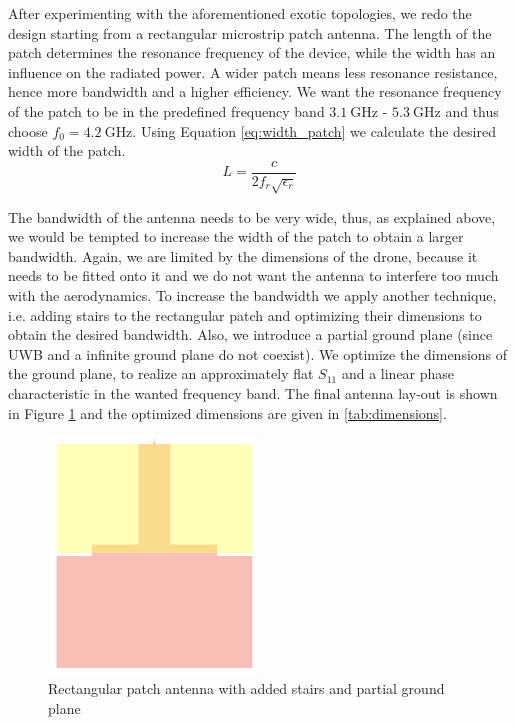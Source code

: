 \documentclass[a4paper]{article}        %
\begin{document}
	After experimenting with the aforementioned exotic topologies, we redo the design starting from a rectangular microstrip patch antenna. The length of the patch determines the resonance frequency of the device, while the width has an influence on the radiated power. A wider patch means less resonance resistance, hence more bandwidth and a higher efficiency. 
	We want the resonance frequency of the patch to be in the predefined frequency band $\SI{3.1}{\giga\hertz}$ - $\SI{5.3}{\giga\hertz}$ and thus choose $f_0 = \SI{4.2}{\giga\hertz}$. Using Equation \eqref{eq:width_patch} we calculate the desired width of the patch.
	\begin{equation} 
	L = \frac{c}{2 f_r \sqrt{\epsilon_r}}
	\label{eq:width_patch}
	\end{equation}

  The bandwidth of the antenna needs to be very wide, thus, as explained above, we would be tempted to increase the width of the patch to obtain a larger bandwidth. Again, we are limited by the dimensions of the drone, because it needs to be fitted onto it and we do not want the antenna to interfere too much with the aerodynamics. To increase the bandwidth we apply another technique, i.e. adding stairs to the rectangular patch and optimizing their dimensions to obtain the desired bandwidth. Also, we introduce a partial ground plane (since UWB and a infinite ground plane do not coexist). We optimize the dimensions of the ground plane, to realize an approximately flat $S_{11}$ and a linear phase characteristic in the wanted frequency band. The final antenna lay-out is shown in Figure \ref{fig:patch_stairs} and the optimized dimensions are given in \autoref{tab:dimensions}.

	\begin{figure}[H]
	\centering
		\includegraphics[width=0.5\textwidth]{images/antenna/patch_stairs.png}
		\caption{Rectangular patch antenna with added stairs and partial ground plane}
		\label{fig:patch_stairs}
	\end{figure}
\end{document}
